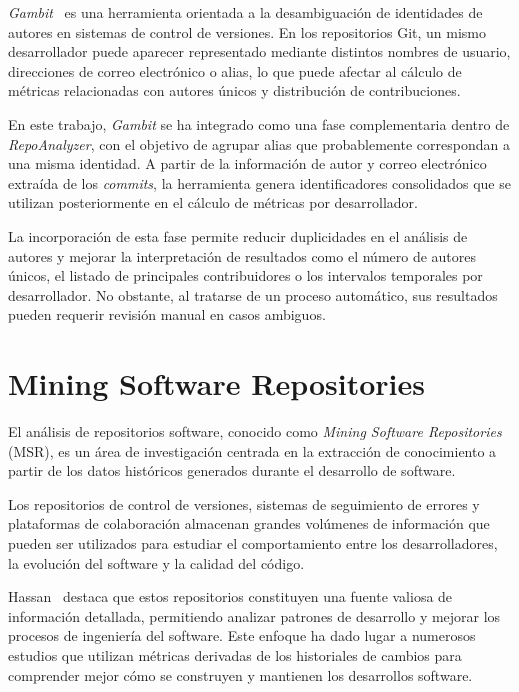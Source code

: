 \documentclass[a4paper, 12pt]{book}
\begin{document}
\emph{Gambit}~\cite{gote2021gambit} es una herramienta orientada a la desambiguación de identidades de autores en sistemas de control de versiones. En los repositorios Git, un mismo desarrollador puede aparecer representado mediante distintos nombres de usuario, direcciones de correo electrónico o alias, lo que puede afectar al cálculo de métricas relacionadas con autores únicos y distribución de contribuciones.

En este trabajo, \emph{Gambit} se ha integrado como una fase complementaria dentro de \emph{RepoAnalyzer}, con el objetivo de agrupar alias que probablemente correspondan a una misma identidad. A partir de la información de autor y correo electrónico extraída de los \emph{commits}, la herramienta genera identificadores consolidados que se utilizan posteriormente en el cálculo de métricas por desarrollador.

La incorporación de esta fase permite reducir duplicidades en el análisis de autores y mejorar la interpretación de resultados como el número de autores únicos, el listado de principales contribuidores o los intervalos temporales por desarrollador. No obstante, al tratarse de un proceso automático, sus resultados pueden requerir revisión manual en casos ambiguos.

\section{Mining Software Repositories}
\label{sec:msr}

El análisis de repositorios software, conocido como \emph{Mining Software Repositories} (MSR), es un área de investigación centrada en la extracción de conocimiento a partir de los datos históricos generados durante el desarrollo de software.

Los repositorios de control de versiones, sistemas de seguimiento de errores y plataformas de colaboración almacenan grandes volúmenes de información que pueden ser utilizados para estudiar el comportamiento entre los desarrolladores, la evolución del software y la calidad del código.

Hassan~\cite{hassan2008road} destaca que estos repositorios constituyen una fuente valiosa de información detallada, permitiendo analizar patrones de desarrollo y mejorar los procesos de ingeniería del software. Este enfoque ha dado lugar a numerosos estudios que utilizan métricas derivadas de los historiales de cambios para comprender mejor cómo se construyen y mantienen los desarrollos software.
\end{document}
